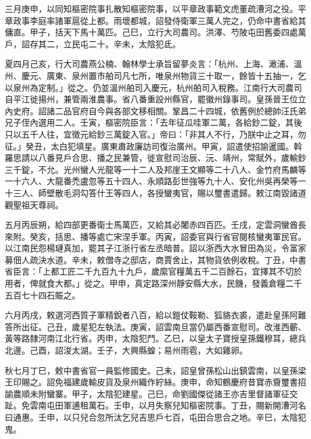 \begin{pinyinscope}
 三月庚申，以同知樞密院事扎散知樞密院事，以平章政事範文虎董疏漕河之役。平章政事李庭率諸軍扈從上都。雨壞都城，詔發侍衛軍三萬人完之，仍命中書省給其傭直。甲子，括天下馬十萬匹。己巳，立行大司農司。洪澤、芍陂屯田舊委四處萬戶，詔存其二，立民屯二十。辛未，太陰犯氐。



 夏四月己亥，行大司農燕公楠、翰林學士承旨留夢炎言：「杭州、上海、澉浦、溫州、慶元、廣東、泉州置市舶司凡七所，唯泉州物貨三十取一，餘皆十五抽一，乞以泉州為定制。」從之。仍並溫州舶司入慶元，杭州舶司入稅務。江南行大司農司自平江徙揚州，兼管兩淮農事。省八番重設州縣官，罷徽州錄事司。皇孫晉王位立內史府。詔諸二品官府自今與各部文移相關。鞏昌二十四城，依舊例於總帥汪氏弟兄子侄內選用二人。壬寅，樞密院臣言：「去年征瓜哇軍二萬，各給鈔二錠，其後只以五千人往，宜徵元給鈔三萬錠入官。」帝曰：「非其人不行，乃朕中止之耳，勿征。」癸丑，太白犯填星。廣東肅政廉訪司復治廣州。甲寅，詔遣使招諭暹國。斡羅思請以八番見戶合思、播之民兼管，徙宣慰司治辰、沅、靖州，常賦外，歲輸鈔三千錠，不允。光州蠻人光龍等一十二人及邦崖王文顯等二十八人、金竹府馬麟等一十六人、大龍番禿盧忽等五十四人、永順路彭世強等九十人、安化州吳再榮等一十三人、師壁散毛洞勾答什王等四人，各授蠻夷官，賜以璽書遣歸。敕江南毀諸道觀聖祖天尊祠。



 五月丙辰朔，給四部更番衛士馬萬匹，又給其必闍赤四百匹。壬戌，定雲洞蠻酋長來附。癸亥，括思、播等處亡宋涅手軍。丙寅，詔委官與行省官閱核蠻夷軍民官。以江南民怨楊璉真加，罷其子江浙行省左丞暗普。詔以浙西大水冒田為災，令富家募佃人疏決水道。辛未，敕僧寺之邸店，商賈舍止，其物貨依例收稅。丁丑，中書省臣言：「上都工匠二千九百九十九戶，歲縻官糧萬五千二百餘石，宜擇其不切於用者，俾就食大都。」從之。甲申，真定路深州靜安縣大水，民饑，發義倉糧二千五百七十四石賑之。



 六月丙戌，敕選河西質子軍精銳者八百，給以鎧仗鞍勒、狐貉衣裘，遣赴皇孫阿難答所出征。己丑，歲星犯左執法。庚寅，詔雲南旦當仍屬西番宣慰司。改淮西蘄、黃等路隸河南江北行省。丙申，太陰犯鬥。乙巳，以皇太子寶授皇孫鐵穆耳，總兵北邊。己酉，詔浚太湖。壬子，大興縣蝗；易州雨雹，大如雞卵。



 秋七月丁巳，敕中書省官一員監修國史。己未，詔皇曾孫松山出鎮雲南，以皇孫梁王印賜之。詔免福建歲輸皮貨及泉州織作紵絲。庚申，命知鶴慶府昔寶赤齎璽書招諭農順未附蠻寨。甲子，太陰犯建星。己巳，命劉國傑從諸王亦吉里督諸軍征交趾。免雲南屯田軍逋租萬石。壬申，以月失察兒知樞密院事。丁丑，賜新開漕河名曰通惠。壬申，以只兒合忽所汰乞兒吉思戶七百，屯田合思合之地。辛巳，太陰犯鬼。




\end{pinyinscope}
